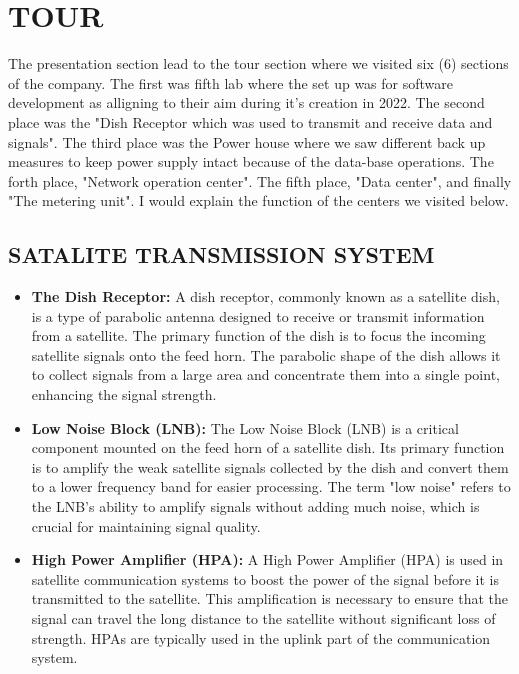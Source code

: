 \documentclass[a4paper,12pt]{report}
\begin{document}
\section[Tour]{TOUR}
The presentation section lead to the tour section where we visited six (6) sections of the company. The first was fifth lab where the set up was for software development as alligning to their aim during it's creation in 2022. The second place was the "Dish Receptor which was used to transmit and receive data and signals". The third place was the Power house where we saw different back up measures to keep power supply intact because of the data-base operations. The forth place, "Network operation center". The fifth place, "Data center", and finally "The metering unit". I would explain the function of the centers we visited below.

\subsection[Satalite communication]{SATALITE TRANSMISSION SYSTEM}
\begin{itemize}
    \item \textbf{The Dish Receptor:} A dish receptor, commonly known as a satellite dish, is a type of parabolic antenna designed to receive or transmit information from a satellite. The primary function of the dish is to focus the incoming satellite signals onto the feed horn. The parabolic shape of the dish allows it to collect signals from a large area and concentrate them into a single point, enhancing the signal strength.
    \item \textbf{Low Noise Block (LNB):} The Low Noise Block (LNB) is a critical component mounted on the feed horn of a satellite dish. Its primary function is to amplify the weak satellite signals collected by the dish and convert them to a lower frequency band for easier processing. The term "low noise" refers to the LNB's ability to amplify signals without adding much noise, which is crucial for maintaining signal quality.
    \item \textbf{High Power Amplifier (HPA):} A High Power Amplifier (HPA) is used in satellite communication systems to boost the power of the signal before it is transmitted to the satellite. This amplification is necessary to ensure that the signal can travel the long distance to the satellite without significant loss of strength. HPAs are typically used in the uplink part of the communication system.
\end{itemize}
\end{document}
